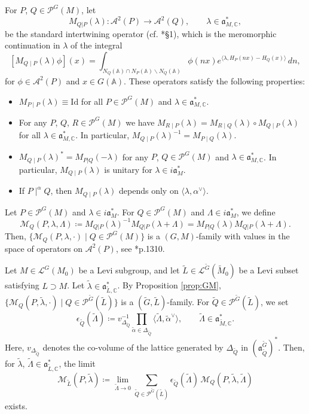 \documentclass[12pt]{amsart}
\theoremstyle{definition}
\theoremstyle{plain}
\theoremstyle{remark}
\def\C{\mathbb{C}}%
\def\A{\mathbb{A}}%
\def\bs{\backslash}%
\newcommand{\fa}{\mathfrak{a}}
\newcommand{\cA}{\mathcal{A}}
\newcommand{\cL}{\mathcal{L}}
\newcommand{\cM}{\mathcal{M}}
\newcommand{\cP}{\mathcal{P}}
\numberwithin{equation}{section}
\newcommand{\tG}{\widetilde{G}}
\newcommand{\tM}{\widetilde{M}}
\newcommand{\tL}{\widetilde{L}}
\newcommand{\tQ}{\widetilde{Q}}
\newcommand{\talpha}{\widetilde{\alpha}}
\newcommand{\tlambda}{\widetilde{\lambda}}
\newcommand{\tLambda}{\widetilde{\Lambda}}
\begin{document}
For $P$, $Q\in \cP^G(M)$, let
\[
M_{Q|P}(\lambda)\colon \cA^2(P)\to \cA^2(Q),
\qquad
\lambda\in \fa^*_{M,\C},
\]
be the standard intertwining operator (cf. \cite{Art82}*{\S1}), which is the meromorphic continuation in $\lambda$ of the integral
\[
[M_{Q\mid P}(\lambda)\phi](x)
=
\int_{N_Q(\A)\cap N_P(\A)\bs N_Q(\A)}
\phi(nx)
e^{\langle \lambda,H_P(nx)-H_Q(x)\rangle}
\, dn,
\]
for $\phi\in \cA^2(P)$ and $x\in G(\A)$.
These operators satisfy the following properties:
\begin{itemize}
    \item
    $M_{P\mid P}(\lambda)\equiv \mathrm{Id}$ for all $P\in \cP^G(M)$ and $\lambda\in \fa^*_{M,\C}$.
    \item
    For any $P$, $Q$, $R\in \cP^G(M)$ we have $M_{R\mid P}(\lambda)=M_{R\mid Q}(\lambda)\circ M_{Q\mid P}(\lambda)$ for all $\lambda\in \fa^*_{M,\C}$. 
    In particular, $M_{Q\mid P}(\lambda)^{-1}=M_{P\mid Q}(\lambda)$.
    \item $M_{Q\mid P}(\lambda)^*=M_{P|Q}(-\lambda)$
    for any $P$, $Q\in \cP^G(M)$ and $\lambda\in \fa^*_{M,\C}$.
    In particular, $M_{Q\mid P}(\lambda)$ is unitary for $\lambda\in i\fa^*_M$.
    \item
    If $P\mid^\alpha Q$, then $M_{Q\mid P}(\lambda)$ depends only on
    $\langle \lambda,\alpha^\vee\rangle$.
\end{itemize}


Let $P\in \cP^G(M)$ and $\lambda\in i\fa^*_M$. 
For $Q\in \cP^G(M)$ and $\Lambda\in i\fa^*_M$, we define
\[
\cM_Q(P,\lambda,\Lambda)
\coloneqq
M_{Q|P}(\lambda)^{-1}
M_{Q|P}(\lambda+\Lambda)
=
M_{P|Q}(\lambda)
M_{Q|P}(\lambda+\Lambda).
\]
Then, $\{\cM_Q(P,\lambda,\cdot)\mid Q\in \cP^G(M)\}$ is a $(G,M)$-family with values in the space of operators on $\cA^2(P)$, see \cite{Art82}*{p.1310}. 


Let $M\in\cL^G(M_0)$ be a Levi subgroup, and let $\tL\in \cL^{\tG}(\tM_0)$ be a Levi subset satisfying $L\supset M$. 
Let $\tlambda\in \fa^*_{\tL,\C}$. 
By Proposition \ref{prop:GM}, 
$\{\cM_Q(P,\tlambda,\cdot)\mid Q\in \cP^{\tG}(\tL)\}$ is a $(\tG,\tL)$-family.
For $\tQ\in\cP^{\tG}(\tL)$, we set
    \[
    \epsilon_{\tQ}(\tLambda)\coloneqq v_{\Delta_{\tQ}}^{-1}\prod_{\talpha\in\Delta_{\tQ}}\langle \tLambda,\talpha^\vee\rangle, \qquad \tLambda\in\fa_{\tM,\C}^*.
    \]
Here, $v_{\Delta_{\tQ}}$ denotes the co-volume of the lattice generated by $\Delta_{\tQ}$ in $(\fa_{\tQ}^{\tG})^*$. 
Then, for $\tlambda$, $\tLambda\in \fa^*_{\tL,\C}$, the limit
\[
\cM_{\tL}(P,\tlambda)
\coloneqq
\lim_{\tLambda\to 0}
\sum_{\tQ\in \cP^{\tG}(\tL)}
\epsilon_{\tQ}(\tLambda)\,
\cM_Q(P,\tlambda,\tLambda)
\]
exists.
\end{document}
